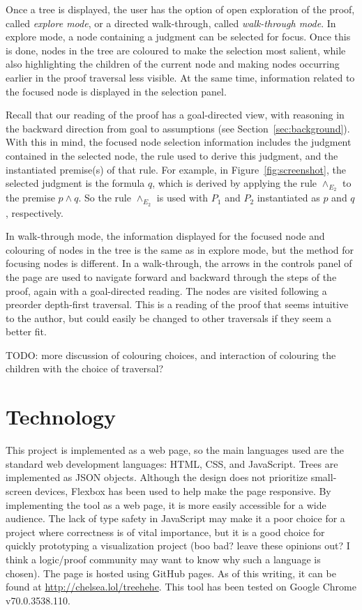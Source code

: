 \documentclass[conference]{IEEEtran}
\begin{document}
Once a tree is displayed, the user has the option of open exploration of the proof, called \textit{explore mode}, or a directed walk-through, called \textit{walk-through mode}. In explore mode, a node containing a judgment can be selected for focus. Once this is done, nodes in the tree are coloured to make the selection most salient, while also highlighting the children of the current node and making nodes occurring earlier in the proof traversal less visible. At the same time, information related to the focused node is displayed in the selection panel.

Recall that our reading of the proof has a goal-directed view, with reasoning in the backward direction from goal to assumptions (see Section~\ref{sec:background}). With this in mind, the focused node selection information includes the judgment contained in the selected node, the rule used to derive this judgment, and the instantiated premise(s) of that rule. For example, in Figure~\ref{fig:screenshot}, the selected judgment is the formula $q$, which is derived by applying the rule $\wedge_{E_2}$ to the premise $p \wedge q$. So the rule $\wedge_{E_2}$ is used with $P_1$ and $P_2$ instantiated as $p$ and $q$, respectively.

In walk-through mode, the information displayed for the focused node and colouring of nodes in the tree is the same as in explore mode, but the method for focusing nodes is different. In a walk-through, the arrows in the controls panel of the page are used to navigate forward and backward through the steps of the proof, again with a goal-directed reading. The nodes are visited following a preorder depth-first traversal. This is a reading of the proof that seems intuitive to the author, but could easily be changed to other traversals if they seem a better fit.

TODO: more discussion of colouring choices, and interaction of colouring the children with the choice of traversal? \\

\section{Technology}
\label{sec:technology}

This project is implemented as a web page, so the main languages used are the standard web development languages: HTML, CSS, and JavaScript. Trees are implemented as JSON objects. Although the design does not prioritize small-screen devices, Flexbox has been used to help make the page responsive. By implementing the tool as a web page, it is more easily accessible for a wide audience. The lack of type safety in JavaScript may make it a poor choice for a project where correctness is of vital importance, but it is a good choice for quickly prototyping a visualization project (boo bad? leave these opinions out? I think a logic/proof community may want to know why such a language is chosen). The page is hosted using GitHub pages. As of this writing, it can be found at \url{http://chelsea.lol/treehehe}. This tool has been tested on Google Chrome v70.0.3538.110.
\end{document}
